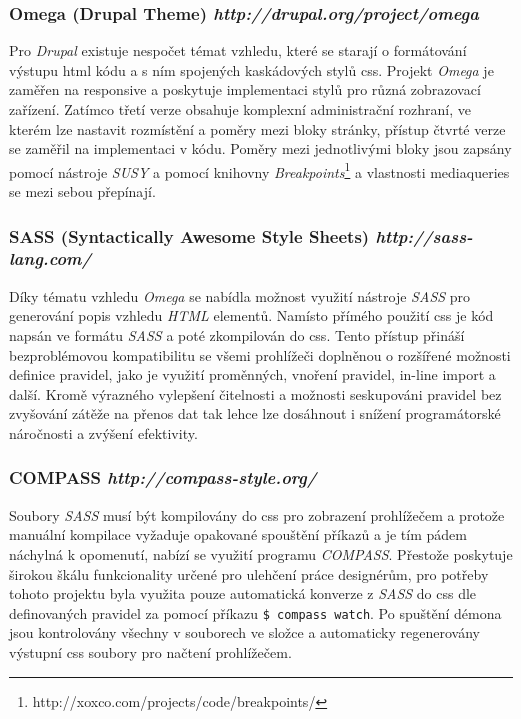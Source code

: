 \subsubsection*{\textbf{Omega} (Drupal Theme) \hfill \emph{http://drupal.org/project/omega}}
\label{subsec:omega}
Pro \emph{Drupal} existuje nespočet témat vzhledu, které se starají o formátování výstupu html kódu a s ním spojených kaskádových stylů \gls{css}. Projekt \emph{Omega} je zaměřen na \gls{responsive} a poskytuje implementaci stylů pro různá zobrazovací zařízení. Zatímco třetí verze obsahuje komplexní administrační rozhraní, ve kterém lze nastavit rozmístění a poměry mezi bloky stránky, přístup čtvrté verze se zaměřil na implementaci v kódu. Poměry mezi jednotlivými bloky jsou zapsány pomocí nástroje \emph{SUSY} a pomocí knihovny \emph{Breakpoints}\footnote{http://xoxco.com/projects/code/breakpoints/} a vlastnosti \gls{mediaqueries} se mezi sebou přepínají.

\subsubsection*{\textbf{SASS} (Syntactically Awesome Style Sheets) \hfill \emph{http://sass-lang.com/}}
\label{subsec:sass}
Díky tématu vzhledu \emph{Omega} se nabídla možnost využití nástroje \emph{SASS} pro generování popis vzhledu \emph{HTML} elementů. Namísto přímého použití \gls{css} je kód napsán ve formátu \emph{SASS} a poté zkompilován do \gls{css}. Tento přístup přináší bezproblémovou kompatibilitu se všemi prohlížeči doplněnou o rozšířené možnosti definice pravidel, jako je využití proměnných, vnoření pravidel, in-line import a další. Kromě výrazného vylepšení čitelnosti a možnosti seskupováni pravidel bez zvyšování zátěže na přenos dat tak lehce lze dosáhnout i snížení programátorské náročnosti a zvýšení efektivity.

\subsubsection*{\textbf{COMPASS} \hfill \emph{http://compass-style.org/}}
\label{subsec:compass}
Soubory \emph{SASS} musí být kompilovány do \gls{css} pro zobrazení prohlížečem a protože manuální kompilace vyžaduje opakované spouštění příkazů a je tím pádem náchylná k opomenutí, nabízí se využití programu \emph{COMPASS}. Přestože poskytuje širokou škálu funkcionality určené pro ulehčení práce designérům, pro potřeby tohoto projektu byla využita pouze automatická konverze z \emph{SASS} do \gls{css} dle definovaných pravidel za pomocí příkazu \texttt{\$ compass watch}. Po spuštění démona jsou kontrolovány všechny v souborech ve složce a automaticky regenerovány výstupní \gls{css} soubory pro načtení prohlížečem.

